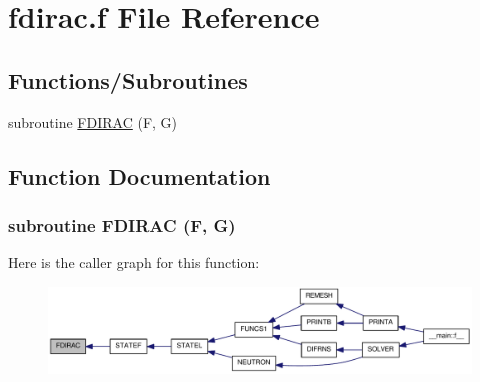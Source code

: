 \hypertarget{fdirac_8f}{
\section{fdirac.f File Reference}
\label{fdirac_8f}
}
\subsection*{Functions/Subroutines}
\begin{DoxyCompactItemize}
\item 
subroutine \hyperlink{fdirac_8f_ae20e2567f58c2c2a56db2a0e267f3ac2}{FDIRAC} (F, G)
\end{DoxyCompactItemize}


\subsection{Function Documentation}
\hypertarget{fdirac_8f_ae20e2567f58c2c2a56db2a0e267f3ac2}{
\subsubsection[{FDIRAC}]{\setlength{\rightskip}{0pt plus 5cm}subroutine FDIRAC (F, \/  G)}}
\label{fdirac_8f_ae20e2567f58c2c2a56db2a0e267f3ac2}


Here is the caller graph for this function:\nopagebreak
\begin{figure}[H]
\begin{center}
\leavevmode
\includegraphics[width=334pt]{fdirac_8f_ae20e2567f58c2c2a56db2a0e267f3ac2_icgraph}
\end{center}
\end{figure}
